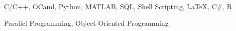 

\begin{cventries}

\cvskills
  {
    \begin{cvitems} %
      \item {C/C++, OCaml, Python, MATLAB, SQL, Shell Scripting, LaTeX, C\#, R} %
      \item {Parallel Programming, Object-Oriented Programming}
    \end{cvitems}
  }
\end{cventries}
